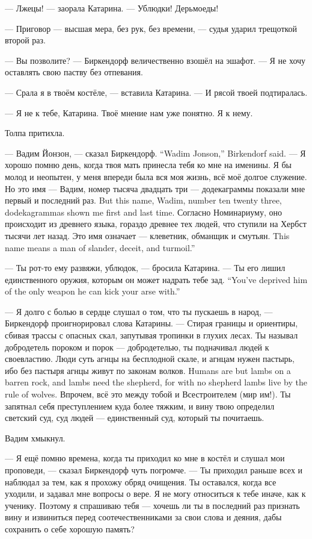 --- Лжецы! --- заорала Катарина.
--- Ублюдки!
Дерьмоеды!

--- Приговор --- высшая мера, без рук, без времени, --- судья ударил трещоткой второй раз.

--- Вы позволите? --- Биркендорф величественно взошёл на эшафот.
--- Я не хочу оставлять свою паству без отпевания.

--- Срала я в твоём костёле, --- вставила Катарина.
--- И рясой твоей подтиралась.

--- Я не к тебе, Катарина.
Твоё мнение нам уже понятно.
Я к нему.

Толпа притихла.

{--- Вадим Йонзон, --- сказал Биркендорф.}
{``Wadim Jonson,'' Birkendorf said.}
--- Я хорошо помню день, когда твоя мать принесла тебя ко мне на именины.
Я бы молод и неопытен, у меня впереди была вся моя жизнь, всё моё долгое служение.
{Но это имя --- Вадим, номер тысяча двадцать три --- додекаграммы показали мне первый и последний раз.}
{But this name, Wadim, number ten twenty three, dodekagrammas shown me first and last time.}
Согласно Номинариуму, оно происходит из древнего языка, гораздо древнее тех людей, что ступили на Хербст тысячи лет назад.
{Это имя означает --- клеветник, обманщик и смутьян.}
{This name means a man of slander, deceit, and turmoil.''}

--- Ты рот-то ему развяжи, ублюдок, --- бросила Катарина.
{--- Ты его лишил единственного оружия, которым он может надрать тебе зад.}
{``You've deprived him of the only weapon he can kick your arse with.''}

--- Я долго с болью в сердце слушал о том, что ты пускаешь в народ, --- Биркендорф проигнорировал слова Катарины.
--- Стирая границы и ориентиры, сбивая трассы с опасных скал, запутывая тропинки в глухих лесах.
Ты называл добродетель пороком и порок --- добродетелью, ты подначивал людей к своевластию.
{Люди суть агнцы на бесплодной скале, и агнцам нужен пастырь, ибо без пастыря агнцы живут по законам волков.}
{Humans are but lambs on a barren rock, and lambs need the shepherd, for with no shepherd lambs live by the rule of wolves.}
Впрочем, всё это между тобой и Всестроителем (мир им!).
Ты запятнал себя преступлением куда более тяжким, и вину твою определил светский суд, суд людей --- единственный суд, который ты почитаешь.

Вадим хмыкнул.

--- Я ещё помню времена, когда ты приходил ко мне в костёл и слушал мои проповеди, --- сказал Биркендорф чуть погромче.
--- Ты приходил раньше всех и наблюдал за тем, как я прохожу обряд очищения.
Ты оставался, когда все уходили, и задавал мне вопросы о вере.
Я не могу относиться к тебе иначе, как к ученику.
Поэтому я спрашиваю тебя --- хочешь ли ты в последний раз признать вину и извиниться перед соотечественниками за свои слова и деяния, дабы сохранить о себе хорошую память?

